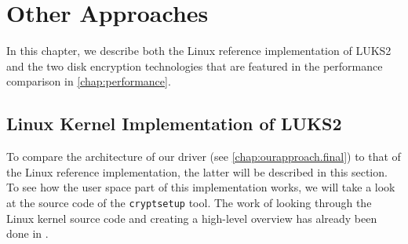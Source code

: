 \chapter{Other Approaches}
\label{chap:otherapproaches}
In this chapter, we describe both the Linux reference implementation of LUKS2 and the two disk encryption technologies that are featured in the performance comparison in \autoref{chap:performance}.

\section{Linux Kernel Implementation of LUKS2}
\label{chap:otherapproaches.linux}
To compare the architecture of our driver (see \autoref{chap:ourapproach.final}) to that of the Linux reference implementation, the latter will be described in this section. To see how the user space part of this implementation works, we will take a look at the source code of the \texttt{cryptsetup} tool. The work of looking through the Linux kernel source code and creating a high-level overview has already been done in \cite{Korchagin2020}.


